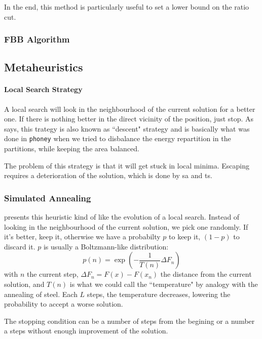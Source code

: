 \documentclass[12pt,a4paper]{article}
\theoremstyle{customdef}
\begin{document}
In the end, this method is particularly useful to set a lower bound on the ratio cut.


\subsubsection{FBB Algorithm~\citep*{Yang1996}}

\subsection{Metaheuristics}

\paragraph{Local Search Strategy}
A local search will look in the neighbourhood of the current solution for a better one.
If there is nothing better in the direct vicinity of the position, just stop.
As \cite{Pirlot1996} says, this trategy is also known as ``descent" strategy and is basically what was done in \texttt{phoney} when we tried to disbalance the energy repartition in the partitions, while keeping the area balanced.

The problem of this strategy is that it will get stuck in local minima.
Escaping requires a deterioration of the solution, which is done by \gls{sa} and \gls{ts}.

\subsubsection{Simulated Annealing}
\cite{Pirlot1996} presents this heuristic kind of like the evolution of a local search.
Instead of looking in the neighbourhood of the current solution, we pick one randomly.
If it's better, keep it, otherwise we have a probabilty $p$ to keep it, $(1-p)$ to discard it.
$p$ is usually a Boltzmann-like distribution:
\[p(n) = \exp{\left(-\frac{1}{T(n)} \Delta F_n\right)}\]
with $n$ the current step, $\Delta F_n = F(x) - F(x_n)$ the distance from the current solution, and $T(n)$ is what we could call the ``temperature" by analogy with the annealing of steel.
Each $L$ steps, the temperature decreases, lowering the probability to accept a worse solution.

The stopping condition can be a number of steps from the begining or a number a steps without enough improvement of the solution.
\end{document}
